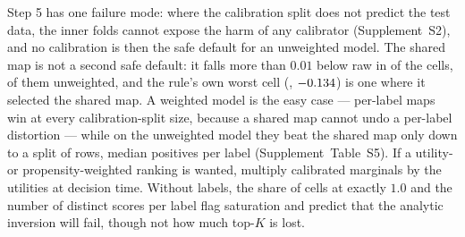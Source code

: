 \documentclass[sigconf,nonacm]{acmart}
\newcommand{\Supp}[1]{Supplement~#1}  %
\begin{document}
Step 5 has one failure mode: where the calibration split does not predict the test data, the inner folds cannot expose the harm of any calibrator (\Supp{S2}), and no calibration is then the safe default for an unweighted model. The shared map is not a second safe default: it falls more than $0.01$ below raw in \nnSharedBelowRaw{} of the \nnTauCells{} cells, \nnSharedBelowRawWone{} of them unweighted, and the rule's own worst cell (\nsharedWorstCell, $-0.134$) is one where it selected the shared map. A weighted model is the easy case --- per-label maps win at every calibration-split size, because a shared map cannot undo a per-label distortion --- while on the unweighted model they beat the shared map only down to a split of \ncalsizeSmallestNcalPlWins{} rows, median \ncalsizeSmallestMedPlWins{} positives per label (\Supp{Table~S5}). If a utility- or propensity-weighted ranking is wanted, multiply calibrated marginals by the utilities at decision time. Without labels, the share of cells at exactly $1.0$ and the number of distinct scores per label flag saturation and predict that the analytic inversion will fail, though not how much top-$K$ is lost.
\end{document}
